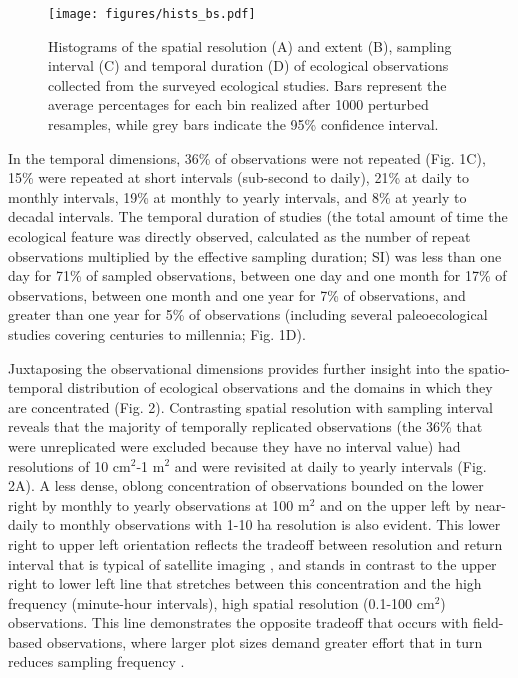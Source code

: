\documentclass[12pt]{article}
\begin{document}

\begin{figure}[!ht]
\texttt{[image: figures/hists\_bs.pdf]}
\vspace{-0.15 cm}
\caption{Histograms of the spatial resolution (A) and extent (B), sampling interval (C) and temporal duration (D) of ecological observations collected from the surveyed ecological studies. Bars represent the average percentages for each bin realized after 1000 perturbed resamples, while grey bars indicate the 95\% confidence interval. }
\label{afoto1}
\end{figure}

In the temporal dimensions, 36\% of observations were not repeated (Fig. 1C), 15\% were repeated at short intervals (sub-second to daily), 21\% at daily to monthly intervals, 19\% at monthly to yearly intervals, and 8\% at yearly to decadal intervals. The temporal duration of studies (the total amount of time the ecological feature was directly observed, calculated as the number of repeat observations multiplied by the effective sampling duration; SI) was less than one day for 71\% of sampled observations, between one day and one month for 17\% of observations, between one month and one year for 7\% of observations, and greater than one year for 5\% of observations (including several paleoecological studies covering centuries to millennia; Fig. 1D).

Juxtaposing the observational dimensions provides further insight into the spatio-temporal distribution of ecological observations and the domains in which they are concentrated (Fig. 2). Contrasting spatial resolution with sampling interval reveals that the majority of temporally replicated observations (the 36\% that were unreplicated were excluded because they have no interval value) had resolutions of 10 cm$^2$-1 m$^2$ and were revisited at daily to yearly intervals (Fig. 2A). A less dense, oblong concentration of observations bounded on the lower right by monthly to yearly observations at 100 m$^2$ and on the upper left by near-daily to monthly observations with 1-10 ha resolution is also evident. This lower right to upper left orientation reflects the tradeoff between resolution and return interval that is typical of satellite imaging \cite{estes_platform_2016}, and stands in contrast to the upper right to lower left line that stretches between this concentration and the high frequency (minute-hour intervals), high spatial resolution (0.1-100 cm$^2$) observations. This line demonstrates the opposite tradeoff that occurs with field-based observations, where larger plot sizes demand greater effort that in turn reduces sampling frequency \cite{kareiva_spatial_1988}.   
\end{document}
